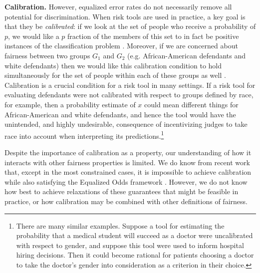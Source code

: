 \noindent\textbf{Calibration.}
However, equalized error rates do not necessarily remove all potential
for discrimination.
When risk tools are used in practice, a key goal is that they be
{\em calibrated}: if we look at the set of people who receive a probability
of $p$, we would like a $p$ fraction of the members of this set to
in fact be positive instances of the classification
problem \cite{dawid1982well}.
Moreover, if we are concerned about fairness between two groups
$G_1$ and $G_2$ (e.g. African-American defendants and white defendants)
then we would like this calibration condition
to hold simultaneously for the set
of people within each of these groups as well
\cite{flores-re-propublica-fair}.
%
Calibration is a crucial condition for a risk tool in many settings.
If a risk tool for
evaluating defendants were not calibrated with respect to groups
defined by race, for example, then a probability estimate of $x$
could mean different things for African-American and white defendants,
and hence the tool would have the unintended, and highly undesirable,
consequence of incentivizing judges to take race into account when
interpreting its predictions.\footnote{There are many similar examples.
Suppose a tool for estimating the probability that a medical student
will succeed as a doctor were uncalibrated with respect to gender,
and suppose this tool were used to inform hospital hiring decisions.
Then it could become rational for patients choosing a doctor to take the
doctor's gender into consideration as a criterion in their choice.}

Despite the importance of calibration as a property,
our understanding of how it interacts
with other fairness properties is limited.
We do know from recent work that,
except in the most constrained
cases, it is impossible to achieve calibration while also
satisfying the Equalized Odds framework
\citep{kleinberg2016inherent,chouldechova2017fair}.
However, we do not know how best to achieve relaxations of these guarantees
that might be feasible in practice, or how calibration may be
combined with other definitions of fairness.

